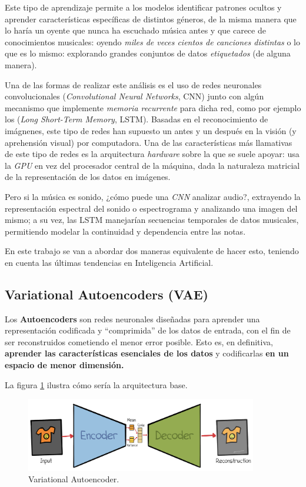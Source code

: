 Este tipo de aprendizaje permite a los modelos identificar patrones ocultos y aprender características específicas de distintos géneros, de la misma manera que lo haría un oyente que nunca ha escuchado música antes y que carece de conocimientos musicales: oyendo \emph{miles de veces cientos de canciones distintas} o lo que es lo mismo: explorando grandes conjuntos de datos \emph{etiquetados} (de alguna manera).

Una de las formas de realizar este análisis es el uso de redes neuronales convolucionales (\emph{Convolutional Neural Networks}, CNN) junto con algún mecanismo que implemente \emph{memoria recurrente} para dicha red, como por ejemplo los (\emph{Long Short-Term Memory}, LSTM). Basadas en el reconocimiento de imágnenes, este tipo de redes han supuesto un antes y un después en la visión (y aprehensión visual) por computadora. Una de las características más llamativas de este tipo de redes es la arquitectura \emph{hardware} sobre la que se suele apoyar: usa la \emph{GPU} en vez del procesador central de la máquina, dada la naturaleza matricial de la representación de los datos en imágenes.

Pero si la música es sonido, ¿cómo puede una \emph{CNN} analizar audio?, extrayendo la representación espectral del sonido o espectrograma y analizando una imagen del mismo; a su vez, las LSTM manejarían secuencias temporales de datos musicales, permitiendo modelar la continuidad y dependencia entre las notas.

En este trabajo se van a abordar dos maneras equivalente de hacer esto, teniendo en cuenta las últimas tendencias en Inteligencia Artificial.

\subsection{Variational Autoencoders (VAE)}

Los \textbf{Autoencoders} son redes neuronales diseñadas para aprender una representación codificada y ``comprimida'' de los datos de entrada, con el fin de ser reconstruidos cometiendo el menor error posible. Esto es, en definitiva, \textbf{aprender las características esenciales de los datos} y codificarlas \textbf{en un espacio de menor dimensión.}

La figura \ref{fig:vae} ilustra cómo sería la arquitectura base.

\begin{figure}[H]
  \centering
  \includegraphics[width=0.9\textwidth]{images/vae.png}
  \caption{Variational Autoencoder.}
  \label{fig:vae}
\end{figure}

